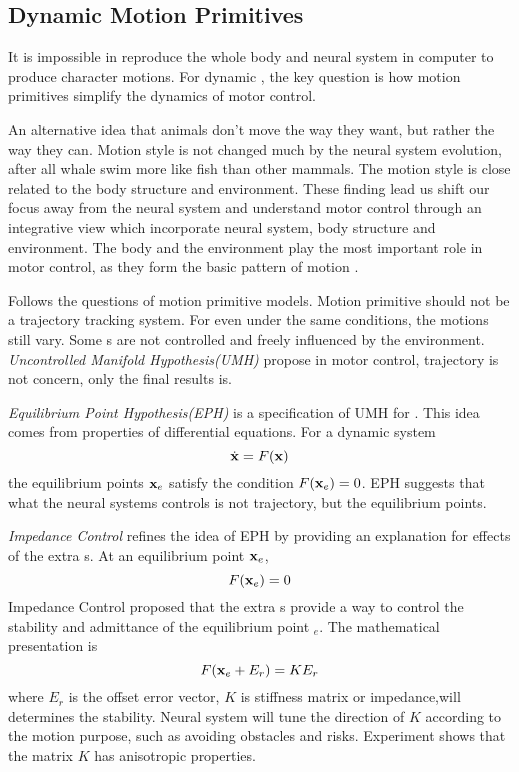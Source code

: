 \subsection{Dynamic Motion Primitives}
It is impossible in reproduce the whole body and neural system in computer to produce character motions.
For dynamic \cms, the key question is how motion primitives simplify the dynamics of motor control.

An alternative idea that animals don’t move the way they want, but rather the way they can. 
Motion style is not changed much by the neural system evolution, after all whale swim more like fish than other mammals.
The motion style is close related to the body structure and environment.
These finding lead us shift our focus away from the neural system and understand motor control through an integrative view which incorporate neural system, body structure and environment\citep{dickinson2000animals}.
The body and the environment play the most important role in motor control, as they form the basic pattern of motion \citep{nishikawa2007neuromechanics}.


Follows the questions of motion primitive models.
Motion primitive should not be a trajectory tracking system.
For even under the same conditions, the motions still vary. 
Some \dof s are not controlled and freely influenced by the environment. 
\emph{Uncontrolled Manifold Hypothesis(UMH)}\citep{latash2008neurophysiological} propose in motor control, trajectory is not concern, only the final results is.


\emph{Equilibrium Point Hypothesis(EPH)}\citep{Feldman1986} is a specification of UMH for . 
This idea comes from properties of differential equations. 
For a dynamic system
\[
\dot{\mathbf{x}}=F(\mathbf{x})
\]
the equilibrium points $\mathbf{x}_{e}$ satisfy the condition $F(\mathbf{x}_{e})=0$.
EPH suggests that what the neural systems controls is not trajectory, but the equilibrium points.



\emph{Impedance Control} \citep{hogan1985ica} refines the idea of EPH by providing an explanation for effects of the extra \dof s. 
At an equilibrium point $\mathbf{x}_{e}$,
\[
F(\mathbf{x}_{e})=0 
\]
Impedance Control proposed that the extra \dof s provide a way to control the stability and admittance of the equilibrium point $_{e}$. 
The mathematical presentation is
\begin{equation}
F(\mathbf{x}_{e}+E_r)=KE_r
\end{equation}
where $E_r$ is the offset error vector, $K$ is stiffness matrix or impedance,will determines the stability.
Neural system will tune the direction of $K$ according to the motion purpose, such as avoiding obstacles and risks. 
Experiment \citep{Franklin2007} shows that the matrix $K$ has anisotropic properties.







